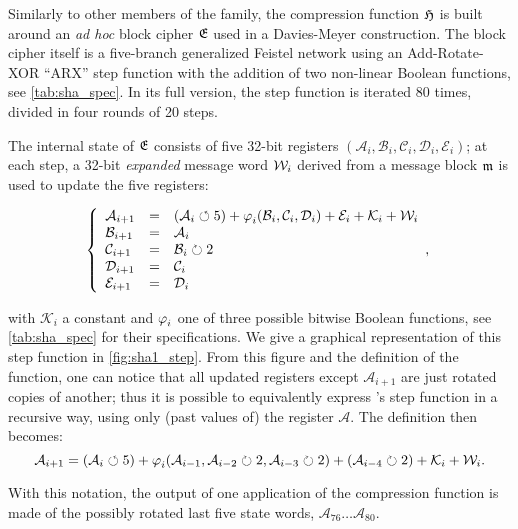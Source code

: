 Similarly to other members of the \mdsha family, the compression function $\operatorname{\mathfrak{H}}$ is built around an \emph{ad hoc} block cipher $\operatorname{\mathfrak{E}}$ used in a Davies-Meyer construction.
The block cipher itself is a five-branch generalized Feistel network using an Add-Rotate-XOR ``ARX'' step function with the addition of two non-linear Boolean functions, see \autoref{tab:sha_spec}.
In its full version, the step function is iterated 80 times, divided in four rounds of 20 steps.

The internal state of $\operatorname{\mathfrak{E}}$ consists of five 32-bit registers $(\mathcal{A}_i, \mathcal{B}_i, \mathcal{C}_i, \mathcal{D}_i, \mathcal{E}_i)$; at each step, a 32-bit \emph{expanded} message word $\mathcal{W}_i$ derived from
a message block $\mathfrak{m}$
is used to update the five registers:

\[
\left\{
\begin{array}{lcl}
\mathcal{A}_{i+1} & = & (\mathcal{A}_i \circlearrowleft 5) + \operatorname{\varphi}_i(\mathcal{B}_i,\mathcal{C}_i,\mathcal{D}_i) + \mathcal{E}_i + \mathcal{K}_i + \mathcal{W}_i\\
\mathcal{B}_{i+1} & = & \mathcal{A}_i\\
\mathcal{C}_{i+1} & = & \mathcal{B}_i \circlearrowright 2 \\
\mathcal{D}_{i+1} & = & \mathcal{C}_i \\
\mathcal{E}_{i+1} & = & \mathcal{D}_i \\
\end{array},
\right.	
\]

\noindent with $\mathcal{K}_i$ a constant and $\operatorname{\varphi}_i$ one of three possible bitwise Boolean functions, see \autoref{tab:sha_spec} for their specifications.
We give a graphical representation of this step function in \autoref{fig:sha1_step}.
From this figure and the definition of the function, one can notice that all updated registers except $\mathcal{A}_{i+1}$ are just rotated copies of another;
thus it is possible to equivalently express \shaone's step function in a recursive way, using only (past values of) the register $\mathcal{A}$. The definition then becomes:
\begin{equation}
\label{eq:rec_step}
\mathcal{A}_{i+1} = (\mathcal{A}_i \circlearrowleft 5) + \operatorname{\varphi}_i(\mathcal{A}_{i-1},\mathcal{A}_{i-2}\circlearrowright 2,\mathcal{A}_{i-3}\circlearrowright 2) + (\mathcal{A}_{i-4}\circlearrowright 2) + \mathcal{K}_i + \mathcal{W}_i.
\end{equation}

\noindent
With this notation, the output of one application of the compression function is made of the possibly rotated last five state words, $\mathcal{A}_{76}\ldots \mathcal{A}_{80}$.

